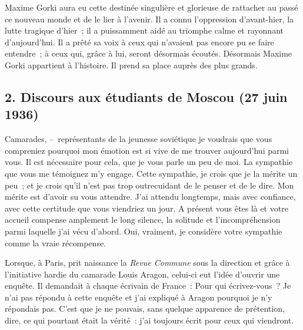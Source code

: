 \documentclass[french,twoside]{book} %
\begin{document}
Maxime Gorki aura eu cette destinée singulière et glorieuse de rattacher au passé ce nouveau monde et de le lier à l’avenir. Il a connu l’oppression d’avant-hier, la lutte tragique d’hier ; il a puissamment aidé au triomphe calme et rayonnant d’aujourd’hui. Il a prêté sa voix à ceux qui n’avaient pas encore pu se faire entendre ; à ceux qui, grâce à lui, seront désormais écoutés. Désormais Maxime Gorki appartient à l’histoire. Il prend sa place auprès des plus grands.
\subsection[{2. Discours aux étudiants de Moscou (27 juin 1936)}]{2. Discours aux étudiants de Moscou (27 juin 1936)}
\noindent Camarades, – représentants de la jeunesse soviétique je voudrais que vous compreniez pourquoi mon émotion est si vive de me trouver aujourd’hui parmi vous. Il est nécessaire pour cela, que je vous parle un peu de moi. La sympathie que vous me témoignez m’y engage. Cette sympathie, je crois que je la mérite un peu ; et je crois qu’il n’est pas trop outrecuidant de le penser et de le dire. Mon mérite est d’avoir su vous attendre. J’ai attendu longtemps, mais avec confiance, avec cette certitude que vous viendriez un jour. A présent vous êtes là et votre accueil compense amplement le long silence, la solitude et l’incompréhension parmi laquelle j’ai vécu d’abord. Oui, vraiment, je considère votre sympathie comme la vraie récompense.\par
Lorsque, à Paris, prit naissance la \emph{Revue Commune} sous la direction et grâce à l’initiative hardie du camarade Louis Aragon, celui-ci eut l’idée d’ouvrir une enquête. Il demandait à chaque écrivain de France : Pour qui écrivez-vous ? Je n’ai pas répondu à cette enquête et j’ai expliqué à Aragon pourquoi je n’y répondais pas. C’est que je ne pouvais, sans quelque apparence de prétention, dire, ce qui pourtant était la vérité : j’ai toujours écrit pour ceux qui viendront.\par
\end{document}
